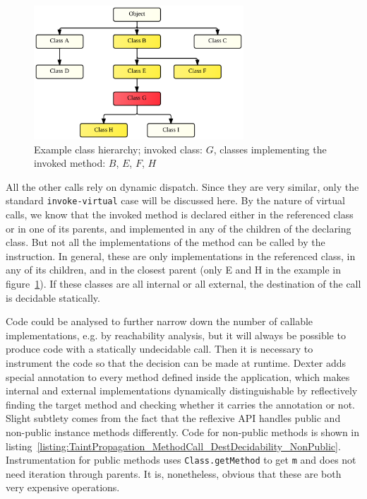 \documentclass[12pt,twoside,notitlepage]{report}
\begin{document}
\begin{figure}
	\centerline{	
		\includegraphics[width=0.7\textwidth]{figs/fig_virtual_call_tree.png}
	}
	\caption{Example class hierarchy; invoked class: $G$, classes implementing the invoked method: $B$, $E$, $F$, $H$}
	\label{fig:TaintPropagation_DestDecision_ClassHierarchy}
\end{figure}

All the other calls rely on dynamic dispatch. Since they are very similar, only the standard \verb$invoke-virtual$ case will be discussed here. By the nature of virtual calls, we know that the invoked method is declared either in the referenced class or in one of its parents, and implemented in any of the children of the declaring class. But not all the implementations of the method can be called by the instruction. In general, these are only implementations in the referenced class, in any of its children, and in the closest parent (only E and H in the example in figure~\ref{fig:TaintPropagation_DestDecision_ClassHierarchy}). If these classes are all internal or all external, the destination of the call is decidable statically. 

Code could be analysed to further narrow down the number of callable implementations, e.g. by reachability analysis, but it will always be possible to produce code with a statically undecidable call. Then it is necessary to instrument the code so that the decision can be made at runtime. Dexter adds special annotation to every method defined inside the application, which makes internal and external implementations dynamically distinguishable by reflectively finding the target method and checking whether it carries the annotation or not. Slight subtlety comes from the fact that the reflexive API handles public and non-public instance methods differently. Code for non-public methods is shown in listing~\ref{listing:TaintPropagation_MethodCall_DestDecidability_NonPublic}. Instrumentation for public methods uses \verb$Class.getMethod$ to get \verb$m$ and does not need iteration through parents. It is, nonetheless, obvious that these are both very expensive operations. 
\end{document}
